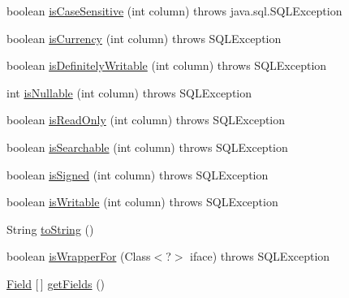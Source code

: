 \begin{DoxyCompactItemize}
\item 
boolean \mbox{\hyperlink{classcom_1_1mysql_1_1cj_1_1jdbc_1_1result_1_1_result_set_meta_data_a100a9826a3a772fc38490ed65d08306d}{is\+Case\+Sensitive}} (int column)  throws java.\+sql.\+S\+Q\+L\+Exception 
\item 
boolean \mbox{\hyperlink{classcom_1_1mysql_1_1cj_1_1jdbc_1_1result_1_1_result_set_meta_data_ac7a3732650739d19c5fa38abc5c3c174}{is\+Currency}} (int column)  throws S\+Q\+L\+Exception 
\item 
boolean \mbox{\hyperlink{classcom_1_1mysql_1_1cj_1_1jdbc_1_1result_1_1_result_set_meta_data_a093b037154dd33aa063eaea7cfde6168}{is\+Definitely\+Writable}} (int column)  throws S\+Q\+L\+Exception 
\item 
int \mbox{\hyperlink{classcom_1_1mysql_1_1cj_1_1jdbc_1_1result_1_1_result_set_meta_data_aa43c80c47922375a72afe54e7a56c865}{is\+Nullable}} (int column)  throws S\+Q\+L\+Exception 
\item 
boolean \mbox{\hyperlink{classcom_1_1mysql_1_1cj_1_1jdbc_1_1result_1_1_result_set_meta_data_abecd50fda9e5c9639b59ac1d0c6d0591}{is\+Read\+Only}} (int column)  throws S\+Q\+L\+Exception 
\item 
boolean \mbox{\hyperlink{classcom_1_1mysql_1_1cj_1_1jdbc_1_1result_1_1_result_set_meta_data_a8f2d4be02326a811c85758f8e2d59313}{is\+Searchable}} (int column)  throws S\+Q\+L\+Exception 
\item 
boolean \mbox{\hyperlink{classcom_1_1mysql_1_1cj_1_1jdbc_1_1result_1_1_result_set_meta_data_af85e5d7b7c03147ed4729bbecb488fd0}{is\+Signed}} (int column)  throws S\+Q\+L\+Exception 
\item 
boolean \mbox{\hyperlink{classcom_1_1mysql_1_1cj_1_1jdbc_1_1result_1_1_result_set_meta_data_ae6883f9f19c1f3e8c515f8d6a2594e88}{is\+Writable}} (int column)  throws S\+Q\+L\+Exception 
\item 
String \mbox{\hyperlink{classcom_1_1mysql_1_1cj_1_1jdbc_1_1result_1_1_result_set_meta_data_a0eafbe5189d19f76e70a011104220551}{to\+String}} ()
\item 
boolean \mbox{\hyperlink{classcom_1_1mysql_1_1cj_1_1jdbc_1_1result_1_1_result_set_meta_data_a297ee666fb7b42a8df2bf1776f9d80e1}{is\+Wrapper\+For}} (Class$<$?$>$ iface)  throws S\+Q\+L\+Exception 
\item 
\mbox{\hyperlink{classcom_1_1mysql_1_1cj_1_1result_1_1_field}{Field}} \mbox{[}$\,$\mbox{]} \mbox{\hyperlink{classcom_1_1mysql_1_1cj_1_1jdbc_1_1result_1_1_result_set_meta_data_a2c1182d90a57279d40706dec8ce2f096}{get\+Fields}} ()
\end{DoxyCompactItemize}
